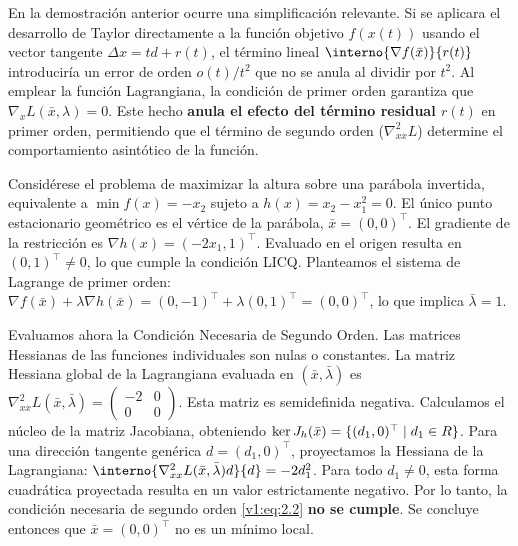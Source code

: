 \begin{notabox}
 En la demostración anterior ocurre una simplificación relevante. Si se aplicara el desarrollo de Taylor directamente a la función objetivo $f(x(t))$ usando el vector tangente $\Delta x = td + r(t)$, el término lineal $\interno{\nabla f(\bar{x})}{r(t)}$ introduciría un error de orden $o(t)/t^2$ que no se anula al dividir por $t^2$. Al emplear la función Lagrangiana, la condición de primer orden garantiza que $\nabla_x L(\bar{x}, \lambda) = 0$. Este hecho \textbf{anula el efecto del término residual $r(t)$} en primer orden, permitiendo que el término de segundo orden ($\nabla^2_{xx} L$) determine el comportamiento asintótico de la función.
\end{notabox}

\begin{example}\label{v1:exa:2.3.1}
 Considérese el problema de maximizar la altura sobre una parábola invertida, equivalente a $\min f(x) = -x_2$ sujeto a $h(x) = x_2 - x_1^2 = 0$. El único punto estacionario geométrico es el vértice de la parábola, $\bar{x} = (0,0)^\top$. El gradiente de la restricción es $\nabla h(x) = (-2x_1, 1)^\top$. Evaluado en el origen resulta en $(0, 1)^\top \neq 0$, lo que cumple la condición LICQ. Planteamos el sistema de Lagrange de primer orden: $\nabla f(\bar{x}) + \lambda \nabla h(\bar{x}) = (0, -1)^\top + \lambda (0, 1)^\top = (0, 0)^\top$, lo que implica $\bar{\lambda} = 1$. 
 
 Evaluamos ahora la Condición Necesaria de Segundo Orden. Las matrices Hessianas de las funciones individuales son nulas o constantes. La matriz Hessiana global de la Lagrangiana evaluada en $(\bar{x}, \bar{\lambda})$ es $\nabla_{xx}^2 L(\bar{x}, \bar{\lambda}) = \begin{pmatrix} -2 & 0 \\ 0 & 0 \end{pmatrix}$. Esta matriz es semidefinida negativa. Calculamos el núcleo de la matriz Jacobiana, obteniendo $\ker J_h(\bar{x}) = \{ (d_1, 0)^\top \mid d_1 \in R \}$. Para una dirección tangente genérica $d = (d_1, 0)^\top$, proyectamos la Hessiana de la Lagrangiana: $\interno{\nabla_{xx}^2 L(\bar{x}, \bar{\lambda}) d}{d} = -2d_1^2$. Para todo $d_1 \neq 0$, esta forma cuadrática proyectada resulta en un valor estrictamente negativo. Por lo tanto, la condición necesaria de segundo orden \eqref{v1:eq:2.2} \textbf{no se cumple}. Se concluye entonces que $\bar{x} = (0,0)^\top$ no es un mínimo local.
\end{example}

